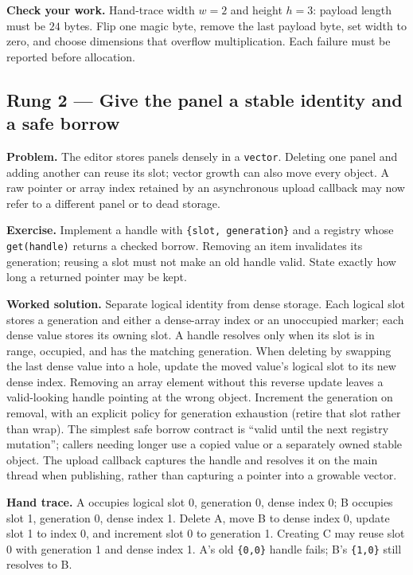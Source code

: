 \textbf{Check your work.} Hand-trace width \(w=2\) and height \(h=3\): payload length must be \(24\) bytes. Flip one magic byte, remove the last payload byte, set width to zero, and choose dimensions that overflow multiplication. Each failure must be reported before allocation.

\subsection{Rung 2 --- Give the panel a stable identity and a safe borrow}\label{02-foundations-ii-ch038-rung-2-give-the-panel-a-stable-identity-and-a-safe-borrow}

\textbf{Problem.} The editor stores panels densely in a \texttt{vector}. Deleting one panel and adding another can reuse its slot; vector growth can also move every object. A raw pointer or array index retained by an asynchronous upload callback may now refer to a different panel or to dead storage.

\textbf{Exercise.} Implement a handle with \texttt{\{slot,\ generation\}} and a registry whose \texttt{get(handle)} returns a checked borrow. Removing an item invalidates its generation; reusing a slot must not make an old handle valid. State exactly how long a returned pointer may be kept.

\textbf{Worked solution.} Separate logical identity from dense storage. Each logical slot stores a generation and either a dense-array index or an unoccupied marker; each dense value stores its owning slot. A handle resolves only when its slot is in range, occupied, and has the matching generation. When deleting by swapping the last dense value into a hole, update the moved value's logical slot to its new dense index. Removing an array element without this reverse update leaves a valid-looking handle pointing at the wrong object. Increment the generation on removal, with an explicit policy for generation exhaustion (retire that slot rather than wrap). The simplest safe borrow contract is ``valid until the next registry mutation''; callers needing longer use a copied value or a separately owned stable object. The upload callback captures the handle and resolves it on the main thread when publishing, rather than capturing a pointer into a growable vector.

\textbf{Hand trace.} A occupies logical slot 0, generation 0, dense index 0; B occupies slot 1, generation 0, dense index 1. Delete A, move B to dense index 0, update slot 1 to index 0, and increment slot 0 to generation 1. Creating C may reuse slot 0 with generation 1 and dense index 1. A's old \texttt{\{0,0\}} handle fails; B's \texttt{\{1,0\}} still resolves to B.


